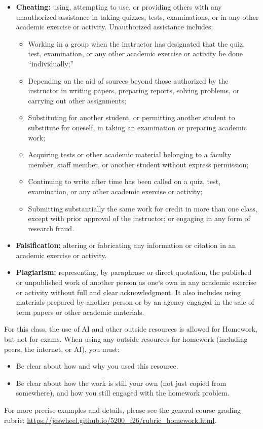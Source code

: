 \documentclass[11pt]{article}\usepackage[]{graphicx}\usepackage[]{xcolor}
\begin{document}
\begin{itemize}
  \item \textbf{Cheating:} using, attempting to use, or providing others with any unauthorized assistance in taking quizzes, tests, examinations, or in any other academic exercise or activity.
  Unauthorized assistance includes:
  \begin{itemize}
    \item Working in a group when the instructor has designated that the quiz, test, examination, or any other academic exercise or activity be done “individually;”
    \item Depending on the aid of sources beyond those authorized by the instructor in writing papers, preparing reports, solving problems, or carrying out other assignments;
    \item Substituting for another student, or permitting another student to substitute for oneself, in taking an examination or preparing academic work;
    \item Acquiring tests or other academic material belonging to a faculty member, staff member, or another student without express permission;
    \item Continuing to write after time has been called on a quiz, test, examination, or any other academic exercise or activity;
    \item Submitting substantially the same work for credit in more than one class, except with prior approval of the instructor; or engaging in any form of research fraud.
  \end{itemize}
  \item \textbf{Falsification:} altering or fabricating any information or citation in an academic exercise or activity.
  \item \textbf{Plagiarism:} representing, by paraphrase or direct quotation, the published or unpublished work of another person as one‘s own in any academic exercise or activity without full and clear acknowledgment. It also includes using materials prepared by another person or by an agency engaged in the sale of term papers or other academic materials.
\end{itemize}

For this class, the use of AI and other outside resources is allowed for Homework, but not for exams.
When using any outside resources for homework (including peers, the internet, or AI), you must:
\begin{itemize}
  \item Be clear about how and why you used this resource.
  \item Be clear about how the work is still your own (not just copied from somewhere), and how you still engaged with the homework problem.
\end{itemize}
For more precise examples and details, please see the general course grading rubric: \url{https://jeswheel.github.io/5200\_f26/rubric\_homework.html}.
\end{document}
